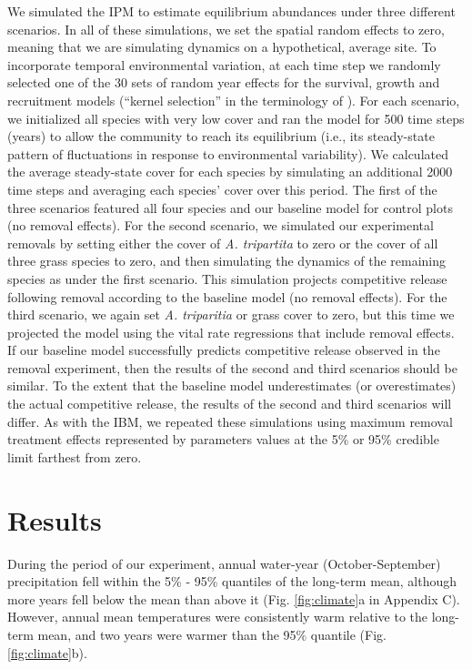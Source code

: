 \documentclass[11pt]{article}
\begin{document}
\begin{doublespacing}
We simulated the IPM to estimate equilibrium abundances under three different scenarios. In all of these simulations, we set the spatial random effects to zero, meaning that we are simulating dynamics on a hypothetical, average site. To incorporate temporal environmental variation, at each time step we randomly selected one of the 30 sets of random year effects for the survival, growth and recruitment models (``kernel selection'' in the terminology of \citealt{metcalf_statistical_2015}). For each scenario, we initialized all species with very low cover and ran the model for 500 time steps (years) to allow the community to reach its equilibrium (i.e., its steady-state pattern of fluctuations in response to environmental variability). We calculated the average steady-state cover for each species by simulating an additional 2000 time steps and averaging each species' cover over this period. The first of the three scenarios featured all four species and our baseline model for control plots (no removal effects). For the second scenario, we simulated our experimental removals by setting either the cover of \textit{A. tripartita} to zero or the cover of all three grass species to zero, and then simulating the dynamics of the remaining species as under the first scenario. This simulation projects competitive release following removal according to the baseline model (no removal effects). For the third scenario, we again set \textit{A. triparitia} or grass cover to zero, but this time we projected the model using the vital rate regressions that include removal effects. If our baseline model successfully predicts competitive release observed in the removal experiment, then the results of the second and third scenarios should be similar. To the extent that the baseline model underestimates (or overestimates) the actual competitive release, the results of the second and third scenarios will differ. As with the IBM, we repeated these simulations using maximum removal treatment effects represented by parameters values at the 5\% or 95\% credible limit farthest from zero. 

\section*{Results}

During the period of our experiment, annual water-year (October-September) precipitation fell within the 5\% - 95\% quantiles of the 
long-term mean, although more years fell below the mean than above it (Fig. \ref{fig:climate}a in Appendix C). However, annual mean temperatures 
were consistently warm relative to the long-term mean, and two years were warmer than the 95\% quantile (Fig. \ref{fig:climate}b).  


\end{doublespacing}
\end{document}
